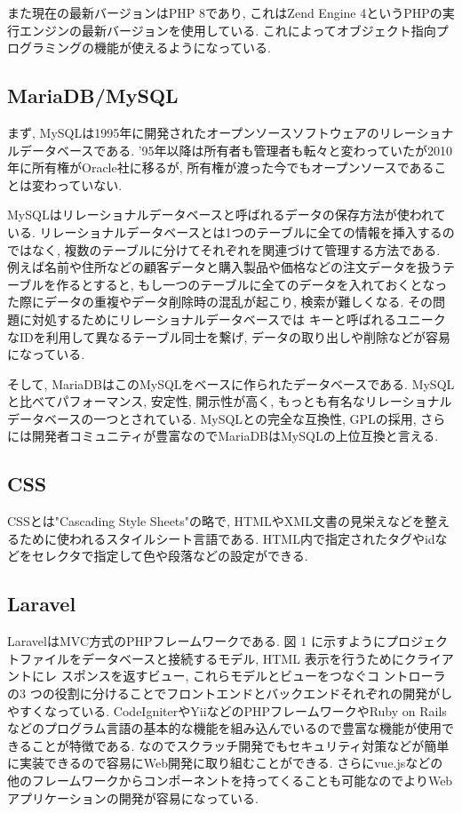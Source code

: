 \documentclass[submit,techrep]{ipsj}
\begin{document}
また現在の最新バージョンはPHP 8であり, これはZend Engine 4というPHPの実行エンジンの最新バージョンを使用している. これによってオブジェクト指向プログラミングの機能が使えるようになっている. 

\subsection{MariaDB/MySQL}
まず, MySQLは1995年に開発されたオープンソースソフトウェアのリレーショナルデータベースである. 
'95年以降は所有者も管理者も転々と変わっていたが2010年に所有権がOracle社に移るが, 所有権が渡った今でもオープンソースであることは変わっていない.

MySQLはリレーショナルデータベースと呼ばれるデータの保存方法が使われている. リレーショナルデータベースとは1つのテーブルに全ての情報を挿入するのではなく, 複数のテーブルに分けてそれぞれを関連づけて管理する方法である. 
例えば名前や住所などの顧客データと購入製品や価格などの注文データを扱うテーブルを作るとすると, もし一つのテーブルに全てのデータを入れておくとなった際にデータの重複やデータ削除時の混乱が起こり, 検索が難しくなる. その問題に対処するためにリレーショナルデータベースでは
キーと呼ばれるユニークなIDを利用して異なるテーブル同士を繋げ, データの取り出しや削除などが容易になっている. 

そして, MariaDBはこのMySQLをベースに作られたデータベースである. MySQLと比べてパフォーマンス, 安定性, 開示性が高く, もっとも有名なリレーショナルデータベースの一つとされている. MySQLとの完全な互換性, GPLの採用, さらには開発者コミュニティが豊富なのでMariaDBはMySQLの上位互換と言える. 
\subsection{CSS}
CSSとは"Cascading Style Sheets"の略で, HTMLやXML文書の見栄えなどを整えるために使われるスタイルシート言語である. 
HTML内で指定されたタグやidなどをセレクタで指定して色や段落などの設定ができる. 

\subsection{Laravel}
LaravelはMVC方式のPHPフレームワークである. 図 1 に示すようにプロジェクトファイルをデータベースと接続するモデル, HTML 表示を行うためにクライアントにレ スポンスを返すビュー, これらモデルとビューをつなぐコ ントローラの3 つの役割に分けることでフロントエンドとバックエンドそれぞれの開発がしやすくなっている. CodeIgniterやYiiなどのPHPフレームワークやRuby on Railsなどのプログラム言語の基本的な機能を組み込んでいるので豊富な機能が使用できることが特徴である. 
なのでスクラッチ開発でもセキュリティ対策などが簡単に実装できるので容易にWeb開発に取り組むことができる. 
さらにvue.jsなどの他のフレームワークからコンポーネントを持ってくることも可能なのでよりWebアプリケーションの開発が容易になっている.
\end{document}
